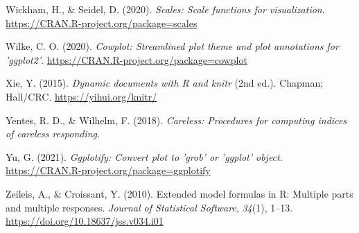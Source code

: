 \documentclass[
  english,
  man, noextraspace,floatsintext]{apa7}
\begin{document}
\begin{appendix}
\leavevmode\hypertarget{ref-R-scales}{}%
Wickham, H., \& Seidel, D. (2020). \emph{Scales: Scale functions for
visualization}. \url{https://CRAN.R-project.org/package=scales}

\leavevmode\hypertarget{ref-R-cowplot}{}%
Wilke, C. O. (2020). \emph{Cowplot: Streamlined plot theme and plot
annotations for 'ggplot2'}.
\url{https://CRAN.R-project.org/package=cowplot}

\leavevmode\hypertarget{ref-R-knitr}{}%
Xie, Y. (2015). \emph{Dynamic documents with R and knitr} (2nd ed.).
Chapman; Hall/CRC. \url{https://yihui.org/knitr/}

\leavevmode\hypertarget{ref-R-careless}{}%
Yentes, R. D., \& Wilhelm, F. (2018). \emph{Careless: Procedures for
computing indices of careless responding}.

\leavevmode\hypertarget{ref-R-ggplotify}{}%
Yu, G. (2021). \emph{Ggplotify: Convert plot to 'grob' or 'ggplot'
object}. \url{https://CRAN.R-project.org/package=ggplotify}

\leavevmode\hypertarget{ref-R-Formula}{}%
Zeileis, A., \& Croissant, Y. (2010). Extended model formulas in R:
Multiple parts and multiple responses. \emph{Journal of Statistical
Software}, \emph{34}(1), 1--13.
\url{https://doi.org/10.18637/jss.v034.i01}

\endgroup
\end{appendix}
\end{document}
